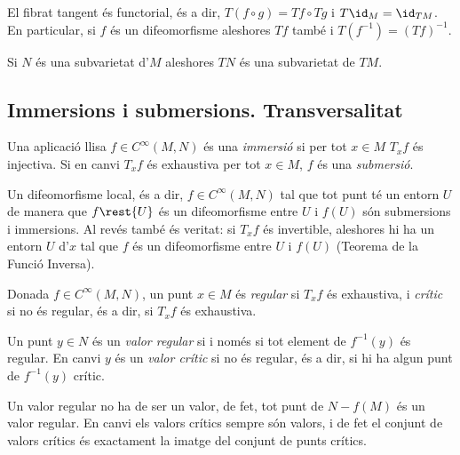 \documentclass[12pt,twocolumn]{article}
\begin{document}
\begin{proposition}
	El fibrat tangent és functorial, és a dir, \( T(f \circ g) = Tf \circ Tg \)  i \( T
	\id_M = \id_{TM} \). En particular, si \( f \) és un difeomorfisme aleshores \( Tf \)
	també i \( T(f^{-1}) = (Tf)^{-1} \).
\end{proposition}

\begin{proposition}
	Si \( N \) és una subvarietat d'\( M \) aleshores \( TN \) és una subvarietat de \( TM \).
\end{proposition}

\subsection{Immersions i submersions. Transversalitat}
\begin{definition}
	Una aplicació llisa \( f \in C^{\infty}(M,N) \) és una \emph{immersió }si per tot \( x \in M \)
	\( T_xf \) és injectiva. Si en canvi \( T_xf \) és exhaustiva per tot \( x \in M \), \(
	f\) és una \emph{submersió}.  
\end{definition}
\begin{observation}
	Un difeomorfisme local, és a dir, \( f \in C^{\infty}(M,N) \) tal que tot punt té un
	entorn \( U \) de manera que \( f\rest{U} \) és un difeomorfisme entre \( U \) i \( f(U)
	\) són submersions i immersions. Al revés també és veritat: si \( T_xf \) és invertible,
	aleshores hi ha un entorn \( U \) d'\( x \) tal que \( f \) és un difeomorfisme entre \(
	U \) i \( f(U) \) (Teorema de la Funció Inversa).
\end{observation}

\begin{definition}
	Donada \( f \in C^{\infty}(M,N) \), un punt \( x \in M \) és \emph{regular} si \( T_xf
	\) és exhaustiva, i \emph{crític} si no és regular, és a dir, si \( T_xf \) és
	exhaustiva. 

	Un punt \( y \in N \) és un \emph{valor regular} si i només si tot element de \(
	f^{-1}(y) \) és regular. En canvi \( y \) és un \emph{valor crític} si no és regular, és
	a dir, si hi ha algun punt de \( f^{-1}(y) \) crític.  
\end{definition}
\begin{observation}
	Un valor regular no ha de ser un valor, de fet, tot punt de \( N - f(M) \) és un valor
	regular. En canvi els valors crítics sempre són valors, i de fet el conjunt de valors
	crítics és exactament la imatge del conjunt de punts crítics.
\end{observation}
\end{document}
